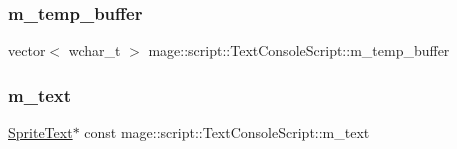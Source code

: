 \subsubsection{\texorpdfstring{m\+\_\+temp\+\_\+buffer}{m\_temp\_buffer}}
{\footnotesize\ttfamily vector$<$ wchar\+\_\+t $>$ mage\+::script\+::\+Text\+Console\+Script\+::m\+\_\+temp\+\_\+buffer\hspace{0.3cm}{\ttfamily [private]}}

\hypertarget{classmage_1_1script_1_1_text_console_script_a60b0a4e3de62e240df32fa2576c67b73}{}\label{classmage_1_1script_1_1_text_console_script_a60b0a4e3de62e240df32fa2576c67b73} 
\subsubsection{\texorpdfstring{m\+\_\+text}{m\_text}}
{\footnotesize\ttfamily \hyperlink{classmage_1_1_sprite_text}{Sprite\+Text}$\ast$ const mage\+::script\+::\+Text\+Console\+Script\+::m\+\_\+text\hspace{0.3cm}{\ttfamily [private]}}

